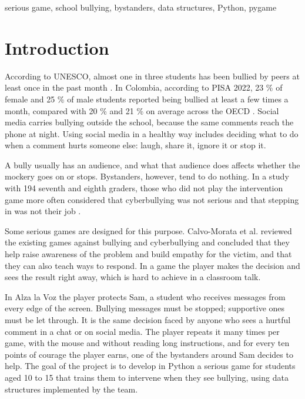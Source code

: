 \documentclass[conference]{IEEEtran}
\begin{document}
\begin{IEEEkeywords}serious game, school bullying, bystanders, data structures, Python, pygame\end{IEEEkeywords}

\section{Introduction}

According to UNESCO, almost one in three students has been bullied by peers at least once in the past month \cite{ref1}. In Colombia, according to PISA 2022, 23 \% of female and 25 \% of male students reported being bullied at least a few times a month, compared with 20 \% and 21 \% on average across the OECD \cite{ref2}. Social media carries bullying outside the school, because the same comments reach the phone at night. Using social media in a healthy way includes deciding what to do when a comment hurts someone else: laugh, share it, ignore it or stop it.

A bully usually has an audience, and what that audience does affects whether the mockery goes on or stops. Bystanders, however, tend to do nothing. In a study with 194 seventh and eighth graders, those who did not play the intervention game more often considered that cyberbullying was not serious and that stepping in was not their job \cite{ref3}.

Some serious games are designed for this purpose. Calvo-Morata et al. \cite{ref4} reviewed the existing games against bullying and cyberbullying and concluded that they help raise awareness of the problem and build empathy for the victim, and that they can also teach ways to respond. In a game the player makes the decision and sees the result right away, which is hard to achieve in a classroom talk.

In Alza la Voz the player protects Sam, a student who receives messages from every edge of the screen. Bullying messages must be stopped; supportive ones must be let through. It is the same decision faced by anyone who sees a hurtful comment in a chat or on social media. The player repeats it many times per game, with the mouse and without reading long instructions, and for every ten points of courage the player earns, one of the bystanders around Sam decides to help. The goal of the project is to develop in Python a serious game for students aged 10 to 15 that trains them to intervene when they see bullying, using data structures implemented by the team.
\end{document}
